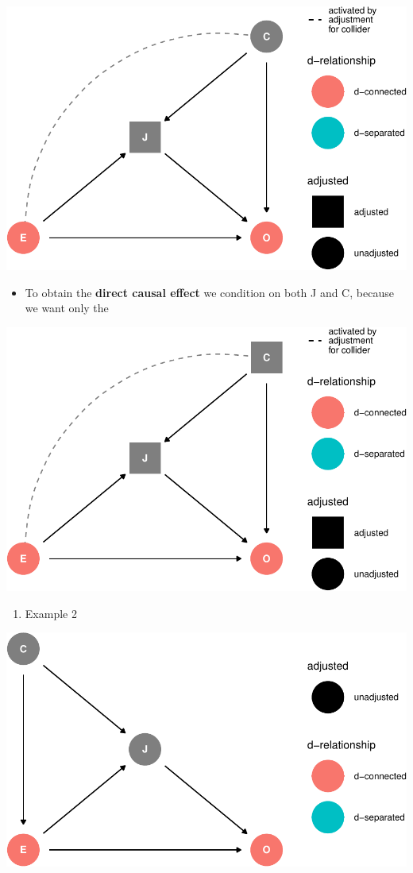 \documentclass[
]{article}
\providecommand{\tightlist}{%
  \setlength{\itemsep}{0pt}\setlength{\parskip}{0pt}}
\begin{document}
\includegraphics{index_files/figure-latex/adjust J ex-1.pdf}

\begin{itemize}
\tightlist
\item
  To obtain the \textbf{direct causal effect} we condition on both J and
  C, because we want only the
\end{itemize}

\includegraphics{index_files/figure-latex/adjust JC ex-1.pdf}

\begin{enumerate}
\def\labelenumi{\arabic{enumi}.}
\setcounter{enumi}{1}
\tightlist
\item
  Example 2
\end{enumerate}

\includegraphics{index_files/figure-latex/dag1.4 ex2-1.pdf}
\end{document}

